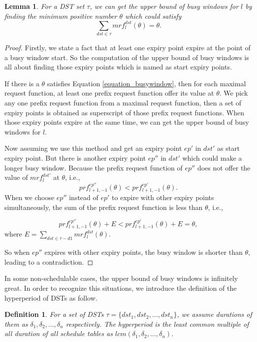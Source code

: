 \documentclass[conference]{IEEEtran}
\newtheorem{definition}{Definition}
\newtheorem{lemma}{Lemma}
\begin{document}
\begin{lemma}
For a DST set $\tau$, we can get the upper bound of busy windows for $l$ by finding the minimum positive number $\theta$ which could satisfy
\begin{equation}
\sum\limits_{dst\in \tau}mrf^{dst}_l(\theta)=\theta.\label{equation_busywindow}
\end{equation}
\end{lemma}\label{lemma_busywindow}
\begin{proof}
Firstly, we state a fact that at least one expiry point expire at the point of a busy window start. So the computation of the upper bound of busy windows is all about finding those expiry points which is named as start expiry points.

If there is a $\theta$ satisfies Equation \ref{equation_busywindow}, then for each maximal request function, at least one prefix request function offer its value at $\theta$. We pick any one prefix request function from a maximal request function, then a set of expiry points is obtained as superscript of those prefix request functions. When those expiry points expire at the same time, we can get the upper bound of busy windows for $l$.

Now assuming we use this method and get an expiry point $ep'$ in $dst'$ as start expiry point. But there is another expiry point $ep''$ in $dst'$ which could make a longer busy window. Because the prefix request function of $ep''$ does not offer the value of $mrf^{dst'}_l$ at $\theta$, i.e.,
\[prf^{ep''}_{l+1,-1}(\theta)<prf^{ep'}_{l+1,-1}(\theta).\]
When we choose $ep''$ instead of $ep'$ to expire with other expiry points simultaneously, the sum of the prefix request function is less than $\theta$, i.e., 

\begin{equation}
prf^{ep''}_{l+1,-1}(\theta)+E<prf^{ep'}_{l+1,-1}(\theta)+E=\theta, 
\end{equation}
where $E=\sum\limits_{dst\in \tau-d1}mrf^{dst}_l(\theta)$.

So when $ep''$ expires with other expiry points, the busy window is shorter than $\theta$, leading to a contradiction.
\end{proof}

In some non-schedulable cases, the upper bound of busy windows is infinitely great. In order to recognize this situations, we introduce the definition of the hyperperiod of DSTs as follow.
\begin{definition}
For a set of DSTs $\tau=\{dst_1,dst_2,\dots,dst_n\}$, we assume durations of them as $\delta_1,\delta_2,\dots,\delta_n$ respectively. The hyperperiod is the least common multiple of all duration of all schedule tables as $lcm(\delta_1,\delta_2,\dots,\delta_n)$.
\end{definition}
\end{document}
